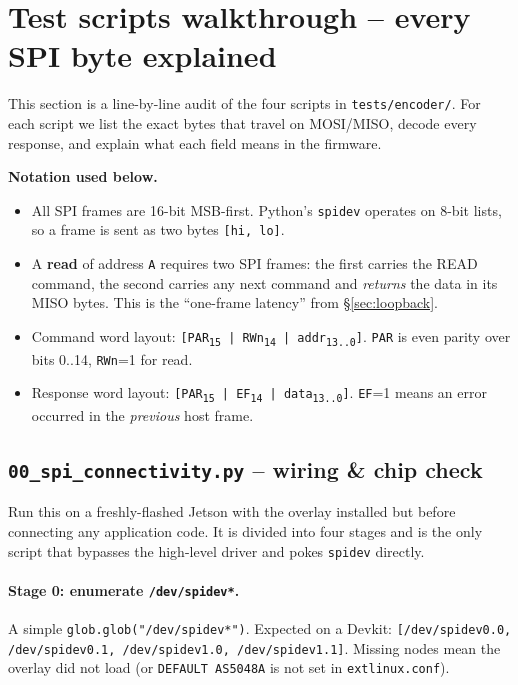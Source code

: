 \documentclass[11pt,a4paper]{article}
\begin{document}
\section{Test scripts walkthrough -- every SPI byte explained}
\label{sec:walkthrough}
This section is a line-by-line audit of the four scripts in
\texttt{tests/encoder/}.  For each script we list the exact bytes that
travel on MOSI/MISO, decode every response, and explain what each
field means in the firmware.

\medskip
\noindent\textbf{Notation used below.}
\begin{itemize}
  \item All SPI frames are 16-bit MSB-first.  Python's \texttt{spidev}
        operates on 8-bit lists, so a frame is sent as two bytes
        \texttt{[hi, lo]}.
  \item A \textbf{read} of address \texttt{A} requires two SPI frames:
        the first carries the READ command, the second carries any
        next command and \emph{returns} the data in its MISO bytes.
        This is the ``one-frame latency'' from
        \S\ref{sec:loopback}.
  \item Command word layout:
        \texttt{[PAR\textsubscript{15} | RWn\textsubscript{14} |
        addr\textsubscript{13..0}]}.  \texttt{PAR} is even parity over
        bits 0..14, \texttt{RWn}=1 for read.
  \item Response word layout:
        \texttt{[PAR\textsubscript{15} | EF\textsubscript{14} |
        data\textsubscript{13..0}]}.  \texttt{EF}=1 means an error
        occurred in the \emph{previous} host frame.
\end{itemize}

\subsection{\texttt{00\_spi\_connectivity.py} -- wiring \& chip check}
Run this on a freshly-flashed Jetson with the overlay installed but
before connecting any application code.  It is divided into four stages
and is the only script that bypasses the high-level driver and pokes
\texttt{spidev} directly.

\paragraph{Stage 0: enumerate \texttt{/dev/spidev*}.}
A simple \texttt{glob.glob("/dev/spidev*")}.  Expected on a Devkit:
\texttt{[/dev/spidev0.0, /dev/spidev0.1, /dev/spidev1.0,
/dev/spidev1.1]}.  Missing nodes mean the overlay did not load (or
\texttt{DEFAULT AS5048A} is not set in \texttt{extlinux.conf}).
\end{document}
